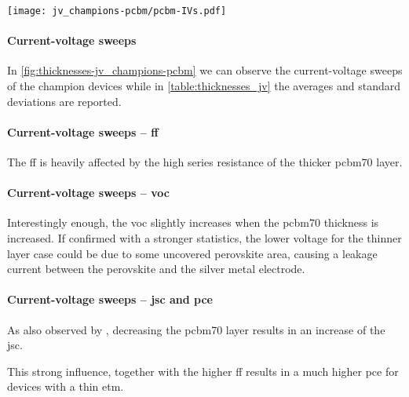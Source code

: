 \begin{SCfigure}
	\centering
	\texttt{[image: jv\_champions-pcbm/pcbm-IVs.pdf]}
	\label{fig:thicknesses-jv_champions-pcbm}
\end{SCfigure}

\paragraph{Current-voltage sweeps}
In \cref{fig:thicknesses-jv_champions-pcbm} we can observe the current-voltage sweeps of the champion devices while in \cref{table:thicknesses_jv} the averages and standard deviations are reported.



\paragraph{Current-voltage sweeps -- \gls{ff}}
The \gls{ff} is heavily affected by the high series resistance of the thicker \gls{pcbm70} layer.


\paragraph{Current-voltage sweeps -- \gls{voc}}
Interestingly enough, the \gls{voc} slightly increases when the \gls{pcbm70} thickness is increased.
If confirmed with a stronger statistics, the lower voltage for the thinner layer case could be due to some uncovered perovskite area, causing a leakage current between the perovskite and the silver metal electrode.

\paragraph{Current-voltage sweeps -- \gls{jsc} and \gls{pce}}
As also observed by , decreasing the \gls{pcbm70} layer results in an increase of the \gls{jsc}.

This strong influence, together with the higher \gls{ff} results in a much higher \gls{pce} for devices with a thin \gls{etm}.



